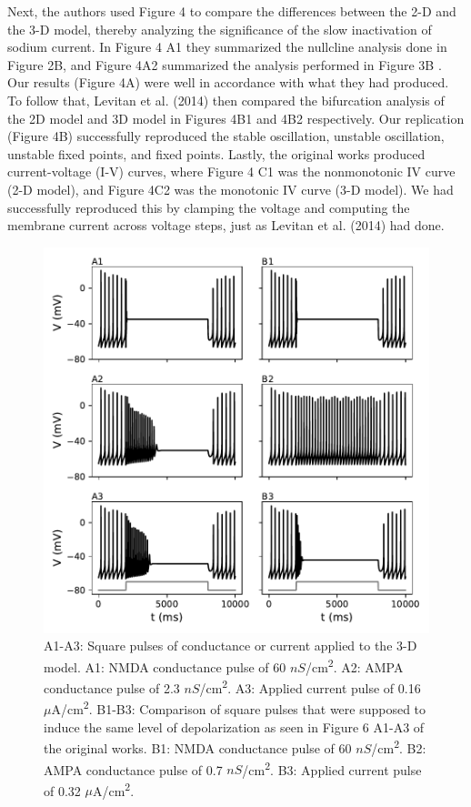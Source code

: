 Next, the authors used Figure 4 to compare the differences between the 2-D and the 3-D model, thereby analyzing the significance of the slow inactivation of sodium current. In Figure 4 A1 they summarized the nullcline analysis done in Figure 2B, and Figure 4A2 summarized the analysis performed in Figure 3B . Our results (Figure 4A) were well in accordance with what they had produced. To follow that, Levitan et al. (2014) then compared the bifurcation analysis of the 2D model and 3D model in Figures 4B1 and 4B2 respectively. Our replication (Figure 4B) successfully reproduced the stable oscillation, unstable oscillation, unstable fixed points, and fixed points. Lastly, the original works produced current-voltage (I-V) curves, where Figure 4 C1 was the nonmonotonic IV curve (2-D model), and Figure 4C2 was the monotonic IV curve (3-D model). We had successfully reproduced this by clamping the voltage and computing the membrane current across voltage steps, just as Levitan et al. (2014) had done.\\ 


\begin{figure}
	\centering
	\includegraphics[scale=0.7]{../figures/figure_6.pdf}
	\caption{A1-A3: Square pulses of conductance or current applied to the 3-D model. A1: NMDA conductance pulse of 60 $nS$/cm\textsuperscript{2}. A2: AMPA conductance pulse of 2.3 $nS$/cm\textsuperscript{2}. A3: Applied current pulse of 0.16 $\mu$A/cm\textsuperscript{2}. B1-B3: Comparison of square pulses that were supposed to induce the same level of depolarization as seen in Figure 6 A1-A3 of the original works. B1: NMDA conductance pulse of 60 $nS$/cm\textsuperscript{2}. B2: AMPA conductance pulse of 0.7 $nS$/cm\textsuperscript{2}. B3: Applied current pulse of 0.32 $\mu$A/cm\textsuperscript{2}. }
	\label{fig:6}
\end{figure}

